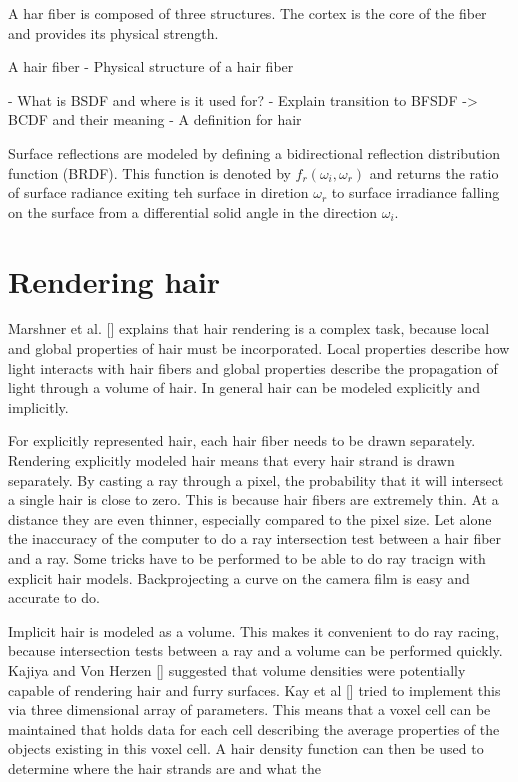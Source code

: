 \documentclass[11pt,a4paper]{report}
\begin{document}
A har fiber is composed of three structures. The cortex is the core of the fiber and provides its physical strength.

 A hair fiber 
- Physical structure of a hair fiber

- What is BSDF and where is it used for?
- Explain transition to BFSDF -> BCDF and their meaning
- A definition for hair


Surface reflections are modeled by defining a bidirectional reflection distribution function (BRDF). This function is denoted by $f_r( \omega_i, \omega_r)$ and returns the ratio of surface radiance exiting teh surface in diretion $\omega_r$ to surface irradiance falling on the surface from a differential solid angle in the direction $\omega_i$.


\section{Rendering hair}

Marshner et al. [] explains that hair rendering is a complex task, because local and global properties of hair must be incorporated. Local properties describe how light interacts with hair fibers and global properties describe the propagation of light through a volume of hair. In general hair can be modeled explicitly and implicitly.

For explicitly represented hair, each hair fiber needs to be drawn separately.
Rendering explicitly modeled hair means that every hair strand is drawn separately. By casting a ray through a pixel, the probability that it will intersect a single hair is close to zero. This is because hair fibers are extremely thin. At a distance they are even thinner, especially compared to the pixel size. Let alone the inaccuracy of the computer to do a ray intersection test between a hair fiber and a ray. Some tricks have to be performed to be able to do ray tracign with explicit hair models.
Backprojecting a curve on the camera film is easy and accurate to do. 

Implicit hair is modeled as a volume. This makes it convenient to do ray racing, because intersection tests between a ray and a volume can be performed quickly. Kajiya and Von Herzen [] suggested that volume densities were potentially capable of rendering hair and furry surfaces. Kay et al [] tried to implement this via three dimensional array of parameters. This means that a voxel cell can be maintained that holds data for each cell describing the average properties of the objects existing in this voxel cell.
A hair density function can then be used to determine where the hair strands are and what the 
\end{document}
